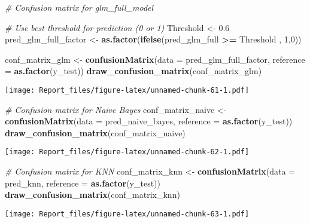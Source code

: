 \documentclass[
]{article}
\newenvironment{Shaded}{\begin{snugshade}}{\end{snugshade}}
\newcommand{\AttributeTok}[1]{\textcolor[rgb]{0.13,0.29,0.53}{#1}}
\newcommand{\CommentTok}[1]{\textcolor[rgb]{0.56,0.35,0.01}{\textit{#1}}}
\newcommand{\DecValTok}[1]{\textcolor[rgb]{0.00,0.00,0.81}{#1}}
\newcommand{\FloatTok}[1]{\textcolor[rgb]{0.00,0.00,0.81}{#1}}
\newcommand{\FunctionTok}[1]{\textcolor[rgb]{0.13,0.29,0.53}{\textbf{#1}}}
\newcommand{\NormalTok}[1]{#1}
\newcommand{\OtherTok}[1]{\textcolor[rgb]{0.56,0.35,0.01}{#1}}
\newcommand{\SpecialCharTok}[1]{\textcolor[rgb]{0.81,0.36,0.00}{\textbf{#1}}}
\begin{document}
\begin{Shaded}
\begin{Highlighting}[]
\CommentTok{\# Confusion matrix for glm\_full\_model}

\CommentTok{\# Use best threshold for prediction (0 or 1)}
\NormalTok{Threshold }\OtherTok{\textless{}{-}} \FloatTok{0.6}
\NormalTok{pred\_glm\_full\_factor }\OtherTok{\textless{}{-}} \FunctionTok{as.factor}\NormalTok{(}\FunctionTok{ifelse}\NormalTok{(pred\_glm\_full }\SpecialCharTok{\textgreater{}=}\NormalTok{ Threshold , }\DecValTok{1}\NormalTok{,}\DecValTok{0}\NormalTok{))}


\NormalTok{conf\_matrix\_glm }\OtherTok{\textless{}{-}} \FunctionTok{confusionMatrix}\NormalTok{(}\AttributeTok{data =}\NormalTok{ pred\_glm\_full\_factor, }
                                     \AttributeTok{reference =} \FunctionTok{as.factor}\NormalTok{(y\_test))}
\FunctionTok{draw\_confusion\_matrix}\NormalTok{(conf\_matrix\_glm)}
\end{Highlighting}
\end{Shaded}

\texttt{[image: Report\_files/figure-latex/unnamed-chunk-61-1.pdf]}

\begin{Shaded}
\begin{Highlighting}[]
\CommentTok{\# Confusion matrix for Naive Bayes}
\NormalTok{conf\_matrix\_naive }\OtherTok{\textless{}{-}} \FunctionTok{confusionMatrix}\NormalTok{(}\AttributeTok{data =}\NormalTok{ pred\_naive\_bayes, }
                                     \AttributeTok{reference =} \FunctionTok{as.factor}\NormalTok{(y\_test))}
\FunctionTok{draw\_confusion\_matrix}\NormalTok{(conf\_matrix\_naive)}
\end{Highlighting}
\end{Shaded}

\texttt{[image: Report\_files/figure-latex/unnamed-chunk-62-1.pdf]}

\begin{Shaded}
\begin{Highlighting}[]
\CommentTok{\# Confusion matrix for KNN}
\NormalTok{conf\_matrix\_knn }\OtherTok{\textless{}{-}} \FunctionTok{confusionMatrix}\NormalTok{(}\AttributeTok{data =}\NormalTok{ pred\_knn, }\AttributeTok{reference =} \FunctionTok{as.factor}\NormalTok{(y\_test))}
\FunctionTok{draw\_confusion\_matrix}\NormalTok{(conf\_matrix\_knn)}
\end{Highlighting}
\end{Shaded}

\texttt{[image: Report\_files/figure-latex/unnamed-chunk-63-1.pdf]}
\end{document}
